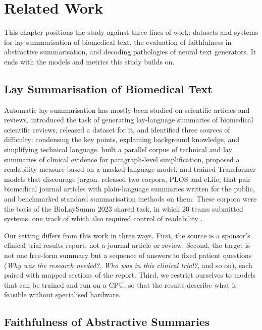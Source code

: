 
\chapter{Related Work} %
\label{related_work}

This chapter positions the study against three lines of work: datasets and systems for lay summarisation of biomedical text, the evaluation of faithfulness in abstractive summarisation, and decoding pathologies of neural text generators. It ends with the models and metrics this study builds on.

\section{Lay Summarisation of Biomedical Text}

Automatic lay summarisation has mostly been studied on scientific articles and reviews. \textcite{guo2021lay} introduced the task of generating lay-language summaries of biomedical scientific reviews, released a dataset for it, and identified three sources of difficulty: condensing the key points, explaining background knowledge, and simplifying technical language. \textcite{devaraj2021paragraph} built a parallel corpus of technical and lay summaries of clinical evidence for paragraph-level simplification, proposed a readability measure based on a masked language model, and trained Transformer models that discourage jargon. \textcite{goldsack2022making} released two corpora, PLOS and eLife, that pair biomedical journal articles with plain-language summaries written for the public, and benchmarked standard summarisation methods on them. These corpora were the basis of the BioLaySumm 2023 shared task, in which 20 teams submitted systems, one track of which also required control of readability \parencite{goldsack2023biolaysumm}.

Our setting differs from this work in three ways. First, the source is a sponsor's clinical trial results report, not a journal article or review. Second, the target is not one free-form summary but a sequence of answers to fixed patient questions (\emph{Why was the research needed?}, \emph{Who was in this clinical trial?}, and so on), each paired with mapped sections of the report. Third, we restrict ourselves to models that can be trained and run on a CPU, so that the results describe what is feasible without specialised hardware.

\section{Faithfulness of Abstractive Summaries}

